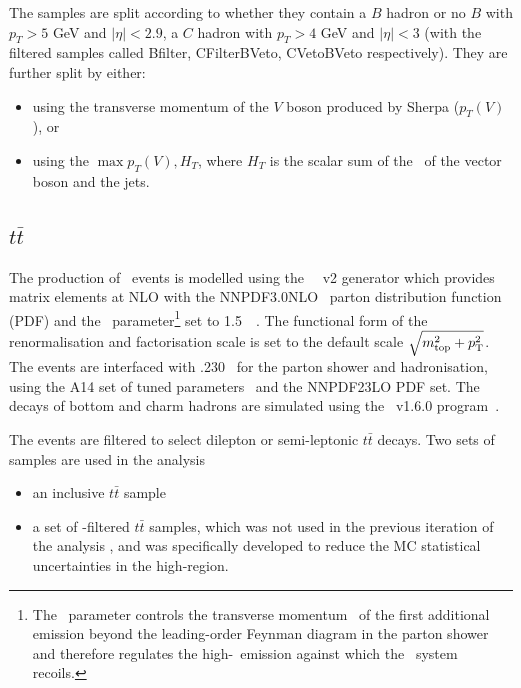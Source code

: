 \par The samples are split according to whether they contain a $B$ hadron or no $B$ with $p_T > 5$ GeV and $|\eta|<2.9$, a $C$ hadron with $p_T > 4$ GeV and $|\eta|<3$ 
(with the filtered samples called Bfilter, CFilterBVeto, CVetoBVeto respectively). They are further split by either:
\begin{itemize}
\item using the transverse momentum of the $V$ boson produced by Sherpa ($p_T(V)$), or
\item using the $\max{p_T(V),H_T}$, where $H_T$ is the scalar sum of the \pt~of the vector boson and the jets.
\end{itemize}%

\subsection{$t\bar{t}$}
\par The production of \ttbar\ events is modelled using the \powhegbox~\cite{Frixione:2007nw,Nason:2004rx,Frixione:2007vw,Alioli:2010xd}~v2
generator which provides matrix elements at NLO with the NNPDF3.0NLO~\cite{Ball:2014uwa} parton distribution function (PDF) and the \hdamp\ parameter\footnote{The \hdamp\ parameter
controls the transverse momentum \pt\ of the first additional emission beyond the leading-order Feynman diagram
in the parton shower and therefore regulates the  high-\pt\ emission against which the \ttbar\ system recoils.} set to 1.5~\mtop~\cite{ATL-PHYS-PUB-2016-020}.
The functional form of the renormalisation and factorisation scale is set to the default scale $\sqrt{m_{\textrm{top}}^2 + p_{\textrm T}^2}$.
The events are interfaced with \pythia.230~\cite{Sjostrand:2014zea} for the parton shower and hadronisation,
using the A14 set of tuned parameters~\cite{ATL-PHYS-PUB-2014-021}  and the NNPDF23LO PDF set.
The decays of bottom and charm hadrons are simulated using the \evtgen\ v1.6.0 program~\cite{EvtGen}.


\par The events are filtered to select dilepton or semi-leptonic $t\bar{t}$ decays. Two sets of samples are used in the analysis
\begin{itemize}
\item an inclusive $t\bar{t}$ sample
\item a set of \met-filtered $t\bar{t}$ samples, which was not used in the previous iteration of the analysis \cite{ATLAS-CONF-2018-039}, and was specifically developed to reduce the 
    MC statistical uncertainties in the high-\met region.
\end{itemize}


